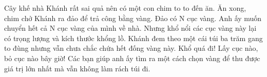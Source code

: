 Cây khế nhà Khánh rất sai quả nên có một con chim to to đến ăn. Ăn xong, chim chở Khánh ra đảo để trả công bằng vàng. Đảo có N cục vàng. Anh ấy muốn chuyển hết cả N cục vàng của mình về nhà. Nhưng khổ nổi các cục vàng này lại có trọng lượng và kích thước khổng lồ. Khánh đem theo một cái túi ba trăm gang to đùng nhưng vẫn chưa chắc chứa hết đống vàng này. Khổ quá đi! Lấy cục nào, bỏ cục nào bây giờ! Các bạn giúp anh ấy tìm ra một cách chọn vàng để thu được giá trị lớn nhất mà vẫn không làm rách túi đi.  

\